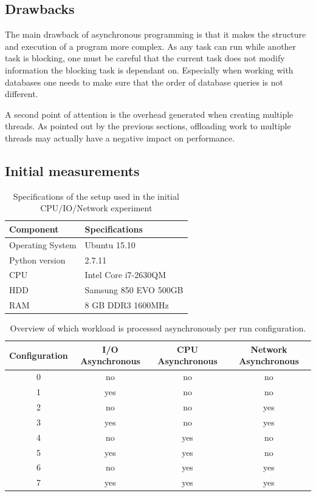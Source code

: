 \subsection{Drawbacks}

The main drawback of asynchronous programming is that it makes the structure and execution of a program more complex.
As any task can run while another task is blocking, one must be careful that the current task does not modify information the blocking task is dependant on.
Especially when working with databases one needs to make sure that the order of database queries is not different.

A second point of attention is the overhead generated when creating multiple threads.
As pointed out by the previous sections, offloading work to multiple threads may actually have a negative impact on performance.

\subsection{Initial measurements}

\begin{table}[h]
	\centering
	\caption{Specifications of the setup used in the initial CPU/IO/Network experiment}
	\label{table:setup_initial_experiment}
	\begin{tabular}{l|l}
		\textbf{Component} 	& \textbf{Specifications} \\ \hline
		Operating System   	& Ubuntu 15.10 \\
		Python version		& 2.7.11 \\
		CPU					& Intel Core i7-2630QM \\ 
		HDD					& Samsung 850 EVO 500GB  \\ 
		RAM					& 8 GB DDR3 1600MHz \\
	\end{tabular}
\end{table}

\begin{table}[]
	\centering
	\caption{Overview of which workload is processed asynchronously per run configuration.}
	\label{tbl:experiment_configuration}
	\begin{tabular}{|c|c|c|c|}
		\hline
		\textbf{Configuration}	& \textbf{I/O Asynchronous} & \textbf{CPU Asynchronous} & \textbf{Network Asynchronous} \\ \hline
		0	& no & no & no \\ \hline
		1	& yes & no & no \\ \hline
		2	& no & no & yes \\ \hline
		3	& yes & no & yes \\ \hline
		4	& no & yes & no \\ \hline
		5	& yes & yes & no \\ \hline
		6	& no & yes & yes \\ \hline
		7	& yes & yes & yes \\ \hline
	\end{tabular}
\end{table}

